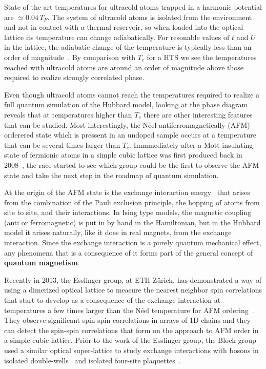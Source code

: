 \documentclass[oneside,11pt]{memoir}
\begin{document}
State of the art temperatures for ultracold atoms trapped in a harmonic
potential are $\simeq 0.04\,T_{F}$.   The system of ultracold atoms is isolated
from the environment and not in contact with a thermal reservoir,  so when
loaded into the optical lattice  its temperature can change adiabatically.  For
resonable values of $t$ and $U$ in the lattice, the adiabatic change of the
temperature is typically less than an order of magnitude~\cite{Kohl2006}.   By
comparison with $T_{c}$ for a HTS we see the temperatures reached with
ultracold atoms are around an order of magnitude above those required to
realize strongly correlated phase. 

Even though ultracold atoms cannot reach the temperatures required to realize a
full quantum simulation of the Hubbard model,  looking at the phase diagram
reveals that at temperatures higher than $T_{c}$ there are other interesting
features that can be studied.  Most interestingly, the N\'{e}el
antiferromagnetically (AFM) orderered state which is pressent in an undoped
sample occurs at a temperature that can be several times larger than $T_{c}$.
Immmediately after a Mott insulating state of fermionic atoms in a simple cubic
lattice was first produced back in 2008~\cite{Jordens2008,Schneider2008}, the
race started to see which group could be the first to observe the AFM state and
take the next step in the roadmap of quantum simulation.   

At the origin of the AFM state is the exchange interaction
energy~\cite{Koch2012} that arises from the combination of the Pauli exclusion
principle, the hopping of atoms from site to site, and their interactions.  In
Ising type models, the magnetic coupling (anti or ferromagnetic) is put in by
hand in the Hamiltonian,  but in the Hubbard model it arises naturally, like it
does in real magnets, from the exchange interaction.  Since the exchange
interaction is a purely quantum mechanical effect, any phenomena that is a
consequence of it forms part of the general concept of \textbf{quantum
magnetism}.   

Recently in 2013, the Esslinger group, at ETH Z\"{u}rich, has demonstrated a
way of using a dimerized optical lattice to measure the nearest neighbor spin
correlations that start to develop as a consequence of the exchange interaction
at temperatures a few times larger than the N\'{e}el temperature for AFM
ordering~\cite{Greif2013}.  They observe significant spin-spin correlations in
arrays of 1D chains and they can detect the spin-spin correlations that form on
the approach to AFM order in a simple cubic lattice.   Prior to the work of the
Esslinger group, the Bloch group used  a similar  optical super-lattice to
study exchange interactions with bosons in isolated
double-wells~\cite{Trotzky2008} and isolated four-site
plaquettes~\cite{Nascimbene2012}. 
\end{document}
